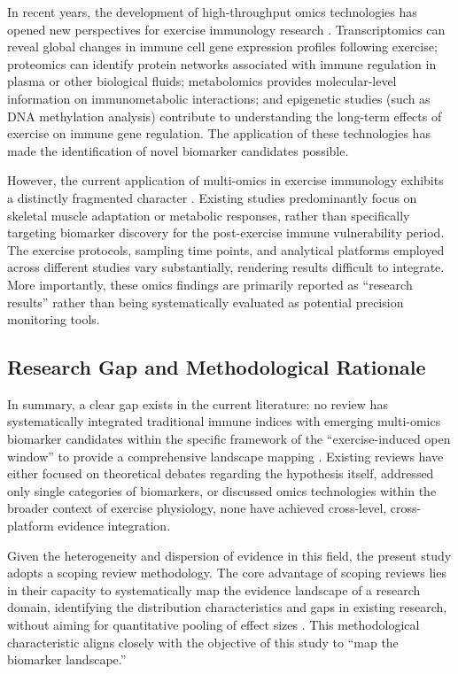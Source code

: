 \documentclass[12pt,a4paper]{article}
\begin{document}
In recent years, the development of high-throughput omics technologies has opened new perspectives for exercise immunology research \citep{nieman2020future}. Transcriptomics can reveal global changes in immune cell gene expression profiles following exercise; proteomics can identify protein networks associated with immune regulation in plasma or other biological fluids; metabolomics provides molecular-level information on immunometabolic interactions; and epigenetic studies (such as DNA methylation analysis) contribute to understanding the long-term effects of exercise on immune gene regulation. The application of these technologies has made the identification of novel biomarker candidates possible.

However, the current application of multi-omics in exercise immunology exhibits a distinctly fragmented character \citep{nieman2020future}. Existing studies predominantly focus on skeletal muscle adaptation or metabolic responses, rather than specifically targeting biomarker discovery for the post-exercise immune vulnerability period. The exercise protocols, sampling time points, and analytical platforms employed across different studies vary substantially, rendering results difficult to integrate. More importantly, these omics findings are primarily reported as ``research results'' rather than being systematically evaluated as potential precision monitoring tools.

\subsection{Research Gap and Methodological Rationale}

In summary, a clear gap exists in the current literature: no review has systematically integrated traditional immune indices with emerging multi-omics biomarker candidates within the specific framework of the ``exercise-induced open window'' to provide a comprehensive landscape mapping \citep{campbell2018debunking,nieman2019compelling,nieman2020future}. Existing reviews have either focused on theoretical debates regarding the hypothesis itself, addressed only single categories of biomarkers, or discussed omics technologies within the broader context of exercise physiology, none have achieved cross-level, cross-platform evidence integration.

Given the heterogeneity and dispersion of evidence in this field, the present study adopts a scoping review methodology. The core advantage of scoping reviews lies in their capacity to systematically map the evidence landscape of a research domain, identifying the distribution characteristics and gaps in existing research, without aiming for quantitative pooling of effect sizes \citep{arksey2005scoping}. This methodological characteristic aligns closely with the objective of this study to ``map the biomarker landscape.''
\end{document}
